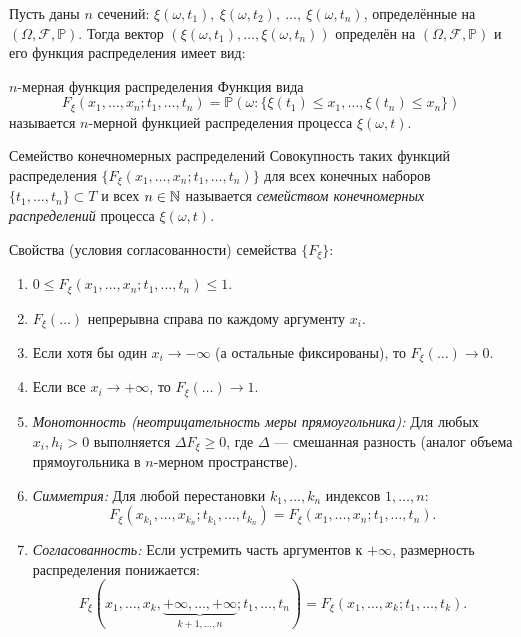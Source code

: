 Пусть даны $n$ сечений: $\xi(\omega, t_1), ~ \xi(\omega, t_2), ~ \dots, ~ \xi(\omega, t_n)$, определённые на $(\Omega, \mathcal{F}, \mathbb{P})$. Тогда вектор $(\xi(\omega, t_1), \dots, \xi(\omega, t_n))$ определён на $(\Omega, \mathcal{F}, \mathbb{P})$ и его функция распределения имеет вид:

\begin{definition}{$n$-мерная функция распределения}
    Функция вида
    \[
        F_{\xi}(x_1, \dots, x_n; t_1, \dots, t_n) = \mathbb{P}(\omega : \{ \xi(t_1) \le x_1, \dots, \xi(t_n) \le x_n \})
    \]
    называется $n$-мерной функцией распределения процесса $\xi(\omega, t)$.
\end{definition}

\begin{definition}{Семейство конечномерных распределений}
    Совокупность таких функций распределения $\{F_{\xi}(x_1, \dots, x_n; t_1, \dots, t_n)\}$ для всех конечных наборов $\{t_1, \dots, t_n\} \subset T$ и всех $n \in \mathbb{N}$ называется \textit{семейством конечномерных распределений} процесса $\xi(\omega, t)$.
\end{definition}

Свойства (условия согласованности) семейства $\{F_{\xi}\}$:

\begin{enumerate}
    \item $0 \le F_{\xi}(x_1, \dots, x_n; t_1, \dots, t_n) \le 1$.
    \item $F_{\xi}(\dots)$ непрерывна справа по каждому аргументу $x_i$.
    \item Если хотя бы один $x_i \to -\infty$ (а остальные фиксированы), то $F_{\xi}(\dots) \to 0$.
    \item Если все $x_i \to +\infty$, то $F_{\xi}(\dots) \to 1$.
    \item \textit{Монотонность (неотрицательность меры прямоугольника):}
    Для любых $x_i, h_i > 0$ выполняется $\Delta F_{\xi} \ge 0$, где $\Delta$ — смешанная разность (аналог объема прямоугольника в $n$-мерном пространстве).
    \item \textit{Симметрия:} Для любой перестановки $k_1, \dots, k_n$ индексов $1, \dots, n$:
    \[
        F_{\xi}(x_{k_1}, \dots, x_{k_n}; t_{k_1}, \dots, t_{k_n}) = F_{\xi}(x_1, \dots, x_n; t_1, \dots, t_n).
    \]
    \item \textit{Согласованность:} Если устремить часть аргументов к $+\infty$, размерность распределения понижается:
    \[
        F_{\xi}(x_1, \dots, x_k, \underbrace{+\infty, \dots, +\infty}_{k+1, \dots, n}; t_1, \dots, t_n) = F_{\xi}(x_1, \dots, x_k; t_1, \dots, t_k).
    \]
\end{enumerate}

